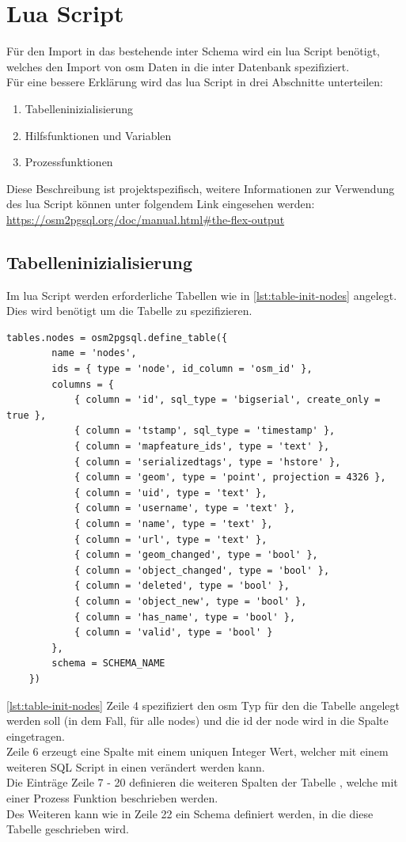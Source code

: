 \section{Lua Script}
Für den Import in das bestehende \gls{inter} Schema wird ein lua Script benötigt, welches den Import von \gls{osm} Daten in die \gls{inter} Datenbank spezifiziert.\\
Für eine bessere Erklärung wird das lua Script in drei Abschnitte unterteilen:
\begin{enumerate}
	\item Tabelleninizialisierung
	\item Hilfsfunktionen und Variablen
	\item Prozessfunktionen
\end{enumerate}
Diese Beschreibung ist projektspezifisch, weitere Informationen zur Verwendung des lua Script können unter folgendem Link eingesehen werden: \\
\url{https://osm2pgsql.org/doc/manual.html#the-flex-output}
\subsection{Tabelleninizialisierung}\label{subsec:table-init}
Im lua Script werden erforderliche Tabellen wie in \autoref{lst:table-init-nodes} angelegt. Dies wird benötigt um die Tabelle zu spezifizieren.
\begin{lstlisting}[language={[5.0]Lua}, caption={Initialisierung eine Tabelle für alle nodes},label={lst:table-init-nodes}]
	tables.nodes = osm2pgsql.define_table({
		name = 'nodes',						
		ids = { type = 'node', id_column = 'osm_id' },
		columns = {
			{ column = 'id', sql_type = 'bigserial', create_only = true },
			{ column = 'tstamp', sql_type = 'timestamp' },
			{ column = 'mapfeature_ids', type = 'text' },
			{ column = 'serializedtags', type = 'hstore' },
			{ column = 'geom', type = 'point', projection = 4326 },
			{ column = 'uid', type = 'text' },
			{ column = 'username', type = 'text' },
			{ column = 'name', type = 'text' },
			{ column = 'url', type = 'text' },
			{ column = 'geom_changed', type = 'bool' },
			{ column = 'object_changed', type = 'bool' },
			{ column = 'deleted', type = 'bool' },
			{ column = 'object_new', type = 'bool' },
			{ column = 'has_name', type = 'bool' },
			{ column = 'valid', type = 'bool' }
		},
		schema = SCHEMA_NAME
	})
\end{lstlisting}
\autoref{lst:table-init-nodes} Zeile 4 spezifiziert den osm Typ für den die Tabelle angelegt werden soll (in dem Fall, für alle nodes) und die id der node wird in die Spalte  eingetragen.\\
Zeile 6 erzeugt eine Spalte mit einem uniquen Integer Wert, welcher mit einem weiteren SQL Script in einen  verändert werden kann.\\
Die Einträge Zeile 7 - 20 definieren die weiteren Spalten der Tabelle , welche mit einer Prozess Funktion beschrieben werden.\\
Des Weiteren kann wie in Zeile 22 ein Schema definiert werden, in die diese Tabelle geschrieben wird.

